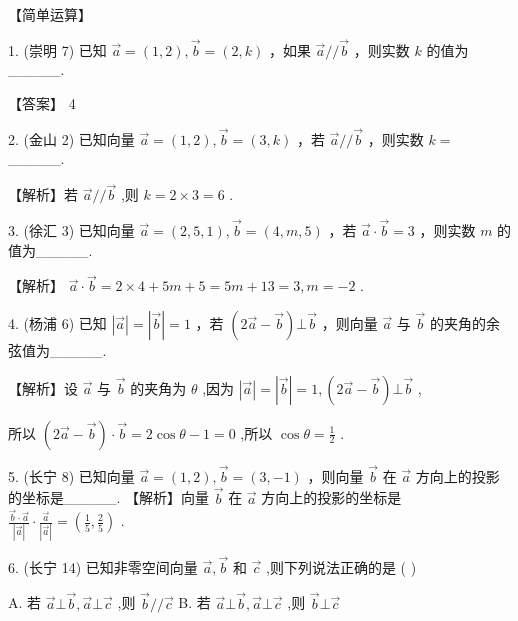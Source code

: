\documentclass[10pt]{article}
\begin{document}
【简单运算】

1. (崇明 7) 已知 \(\overrightarrow{a} = \left( {1,2}\right) ,\overrightarrow{b} = \left( {2,k}\right)\) ，如果 \(\overrightarrow{a}//\overrightarrow{b}\) ，则实数 \(k\) 的值为\_\_\_\_\_.

【答案】 4

2. (金山 2) 已知向量 \(\overrightarrow{a} = \left( {1,2}\right) ,\overrightarrow{b} = \left( {3,k}\right)\) ，若 \(\overrightarrow{a}//\overrightarrow{b}\) ，则实数 \(k =\) \_\_\_\_\_.

【解析】若 \(\overrightarrow{a}//\overrightarrow{b}\) ,则 \(k = 2 \times  3 = 6\) .

3. (徐汇 3) 已知向量 \(\overrightarrow{a} = \left( {2,5,1}\right) ,\overrightarrow{b} = \left( {4,m,5}\right)\) ，若 \(\overrightarrow{a} \cdot  \overrightarrow{b} = 3\) ，则实数 \(m\) 的值为\_\_\_\_\_.

【解析】 \(\overrightarrow{a} \cdot  \overrightarrow{b} = 2 \times  4 + {5m} + 5 = {5m} + {13} = 3,m =  - 2\) .

4. (杨浦 6) 已知 \(\left| \overrightarrow{a}\right|  = \left| \overrightarrow{b}\right|  = 1\) ，若 \(\left( {2\overrightarrow{a} - \overrightarrow{b}}\right)  \bot  \overrightarrow{b}\) ，则向量 \(\overrightarrow{a}\) 与 \(\overrightarrow{b}\) 的夹角的余弦值为\_\_\_\_\_.

【解析】设 \(\overrightarrow{a}\) 与 \(\overrightarrow{b}\) 的夹角为 \(\theta\) ,因为 \(\left| \overrightarrow{a}\right|  = \left| \overrightarrow{b}\right|  = 1,\left( {2\overrightarrow{a} - \overrightarrow{b}}\right)  \bot  \overrightarrow{b}\) ,

所以 \(\left( {2\overrightarrow{a} - \overrightarrow{b}}\right)  \cdot  \overrightarrow{b} = 2\cos \theta  - 1 = 0\) ,所以 \(\cos \theta  = \frac{1}{2}\) .

5. (长宁 8) 已知向量 \(\overrightarrow{a} = \left( {1,2}\right) ,\overrightarrow{b} = \left( {3, - 1}\right)\) ，则向量 \(\overrightarrow{b}\) 在 \(\overrightarrow{a}\) 方向上的投影的坐标是\_\_\_\_\_. 【解析】向量 \(\overrightarrow{b}\) 在 \(\overrightarrow{a}\) 方向上的投影的坐标是 \(\frac{\overrightarrow{b} \cdot  \overrightarrow{a}}{\left| \overrightarrow{a}\right| } \cdot  \frac{\overrightarrow{a}}{\left| \overrightarrow{a}\right| } = \left( {\frac{1}{5},\frac{2}{5}}\right)\) .

6. (长宁 14) 已知非零空间向量 \(\overrightarrow{a},\overrightarrow{b}\) 和 \(\overrightarrow{c}\) ,则下列说法正确的是 ( )

A. 若 \(\overrightarrow{a} \bot  \overrightarrow{b},\overrightarrow{a} \bot  \overrightarrow{c}\) ,则 \(\overrightarrow{b}//\overrightarrow{c}\) B. 若 \(\overrightarrow{a} \bot  \overrightarrow{b},\overrightarrow{a} \bot  \overrightarrow{c}\) ,则 \(\overrightarrow{b} \bot  \overrightarrow{c}\)
\end{document}
